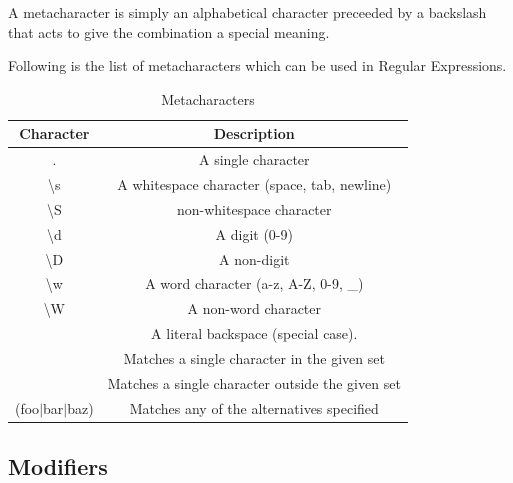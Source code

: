 \documentclass[11pt,a4paper]{article}
\begin{document}
A metacharacter is simply an alphabetical character preceeded by a backslash that acts to give the combination a special meaning.

Following is the list of metacharacters which can be used in Regular Expressions.
\begin{table}[ht]
\begin{center}
\begin{tabular}{| c | c |}\hline
\textbf{Character} & \textbf{Description}\\ \hline
.   &    A single character\\ \hline
\textbackslash s & A whitespace character (space, tab, newline)\\ \hline
\textbackslash S & non-whitespace character\\ \hline
\textbackslash d  & A digit (0-9)\\ \hline
\textbackslash D &  A non-digit\\ \hline
\textbackslash w & A word character (a-z, A-Z, 0-9, \_)\\ \hline
\textbackslash W & A non-word character\\ \hline
[\textbackslash b] & A literal backspace (special case).\\ \hline
[aeiou]  &  Matches a single character in the given set\\ \hline
[\^aeiou]  &   Matches a single character outside the given set\\ \hline
(foo$|$bar$|$baz)  &  Matches any of the alternatives specified\\ \hline
\end{tabular}
\caption{Metacharacters}
\end{center}
\end{table}

\subsection*{Modifiers}
\end{document}
